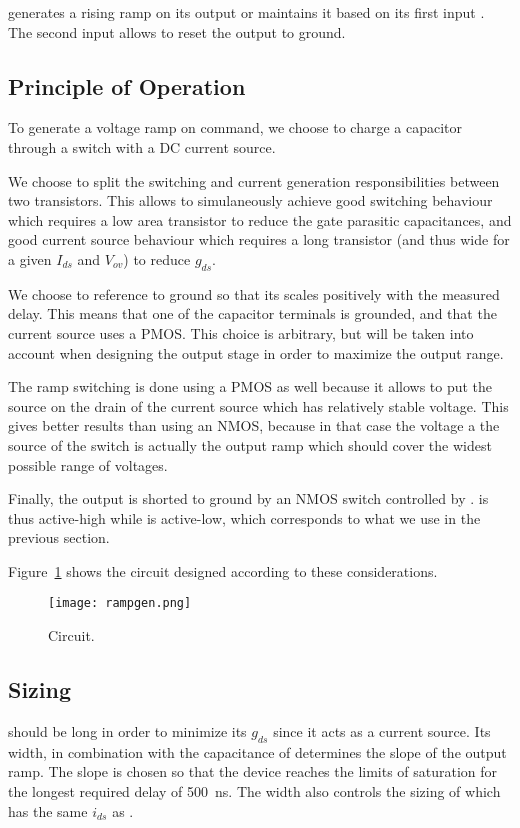  generates a rising ramp on its output  or maintains it based on its first input . The second input  allows to reset the output to ground.

\subsection{Principle of Operation}
To generate a voltage ramp on command, we choose to charge a capacitor through a switch with a DC current source.

We choose to split the switching and current generation responsibilities between two transistors.
This allows to simulaneously achieve good switching behaviour which requires a low area transistor to reduce the gate parasitic capacitances, and good current source behaviour which requires a long transistor (and thus wide for a given $I_{ds}$ and $V_{ov}$) to reduce $g_{ds}$.

We choose to reference  to ground so that its scales positively with the measured delay.
This means that one of the capacitor terminals is grounded, and that the current source uses a PMOS.
This choice is arbitrary, but will be taken into account when designing the output stage in order to maximize the output range.

The ramp switching is done using a PMOS as well because it allows to put the source on the drain of the current source which has relatively stable voltage. This gives better results than using an NMOS, because in that case the voltage a the source of the switch is actually the output ramp which should cover the widest possible range of voltages.

Finally, the output is shorted to ground by an NMOS switch controlled by .  is thus active-high while  is active-low, which corresponds to what we use in the previous section.

Figure~\ref{fig:rampgen} shows the circuit designed according to these considerations.
\begin{figure}
  \centering
  \texttt{[image: rampgen.png]}
  \caption{ Circuit.\label{fig:rampgen}}
\end{figure}

\subsection{Sizing}
 should be long in order to minimize its $g_{ds}$ since it acts as a current source.
Its width, in combination with the capacitance of  determines the slope of the output ramp.
The slope is chosen so that the device reaches the limits of saturation for the longest required delay of \SI{500}{\nano\second}.
The width also controls the sizing of  which has the same $i_{ds}$ as .

